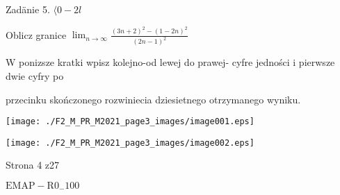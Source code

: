 \documentclass[a4paper,12pt]{article}
\begin{document}
Zadänie 5. $\langle 0-2l$

Oblicz granice $\displaystyle \lim_{n\rightarrow\infty}\frac{(3n+2)^{2}-(1-2n)^{2}}{(2n-1)^{2}}$

W ponizsze kratki wpisz kolejno-od lewej do prawej- cyfre jedności i pierwsze dwie cyfry po

przecinku skończonego rozwiniecia dziesietnego otrzymanego wyniku.
\begin{center}
\texttt{[image: ./F2\_M\_PR\_M2021\_page3\_images/image001.eps]}

\texttt{[image: ./F2\_M\_PR\_M2021\_page3\_images/image002.eps]}
\end{center}
Strona 4 z27

$\mathrm{E}\mathrm{M}\mathrm{A}\mathrm{P}-\mathrm{R}0_{-}100$
\end{document}
